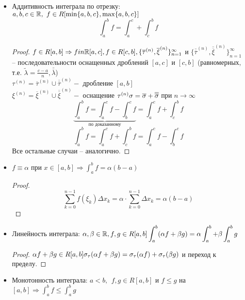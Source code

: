 \begin{itemize}
	\item Аддитивность интеграла по отрезку:\\ $a, b, c \in \mathbb{R}, \ f \in R [\min\{a, b, c\}, \max \{a, b, c\}]$
	\[\int_{a}^{b} f = \int_{a}^{c} + \int_{c}^{b} f\]

	\begin{proof}
		$f\in R[a,b] \Rightarrow f in \mathbb{R}[a,c], f \in R[c,b], \{\overline{\tau}^{(n)}, \overline{\xi}^{(n)}\}^{\infty}_{n=1}$ и $\{\overline{\overline{\tau}}^{(n)}, \overline{\overline{\xi}}^{(n)}\}^{\infty}_{n=1}$ --
		последовательности оснащенных дроблений $[a,c]$ и $[c,b]$  (равномерных, т.е. $\widetilde{\lambda} = \frac{c-a}{n}, \overline{\overline{\lambda}}$)\\
		$\tau^{(n)} = \overline{\tau}^{(n)} \cup \overline{\overline{\tau}}^{(n)} -$ дробление $[a,b]$\\
		$\xi^{(n)} = \overline{\xi}^{(n)} \cup \overline{\overline{\xi}}^{(n)} -$ оснащение $\tau^{(n)}\\
		\sigma = \overline{\sigma} + \overline{\overline{\sigma}}$ при $n \to \infty$\\
		\[\underbrace{\int_{a}^{b} f = \int_{a}^{c} f - \int_{b}^{c} f}_{\text{по доказанному}}  = \int_{a}^{c} f + \int_{c}^{b} f\]
		\[ \int_{a}^{b} f = \int_{a}^{c} f + \int_{c}^{b} f = \int_{a}^{c} f - \int_{b}^{c} f\]
		Все остальные случаи -- аналогично.
	\end{proof}

	\item $f \equiv \alpha$ при $\displaystyle x \in [a,b] \Rightarrow \int_{a}^{b} f = \alpha(b-a)$
	
	\begin{proof}
		\[\sum_{k=0}^{n-1} f(\xi_k) \Delta x_k = \alpha \cdot \sum_{k=0}^{n-1} \Delta x_k = \alpha (b-a)\]
	\end{proof}

	\item Линейность интеграла: $\alpha, \beta \in \mathbb{R}, f, g \in R[a,b]\\
	\displaystyle \int_{a}^{b} (\alpha f + \beta g) = \alpha \int_{a}^{b} + \beta \int_{a}^{b} g$

	\begin{proof}
		$\alpha f + \beta g \in R [a,b]\\
		\sigma_{\tau}(\alpha f + \beta g) = \sigma_{\tau}(\alpha f) + \sigma_{\tau} (\beta g)$ и переход к пределу.
	\end{proof}

	\item Монотонность интеграла: $a < b, \ \ f, g \in R[a,b]$ и $f \leqslant g$ на $\displaystyle [a,b] \Rightarrow \int_{a}^{b} f \leqslant \int_{a}^{b} g$


\end{itemize}
